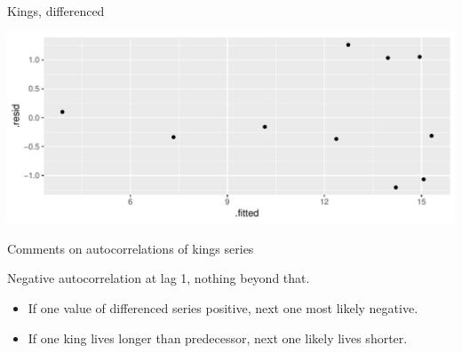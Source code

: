 \begin{frame}[fragile]{Kings, differenced}
  
\begin{knitrout}
\color{fgcolor}\begin{kframe}
\begin{alltt}
\end{alltt}
\end{kframe}
\includegraphics[width=\maxwidth]{figure/unnamed-chunk-19-1} 

\end{knitrout}
  
\end{frame}

\begin{frame}{Comments on autocorrelations of kings series}
  

Negative autocorrelation at lag 1, nothing beyond that. 

\begin{itemize}
\item If one value of differenced series positive, next one most
  likely negative. 
\item If one king lives longer than predecessor, next one likely lives shorter.

\end{itemize}
  
  
\end{frame}

